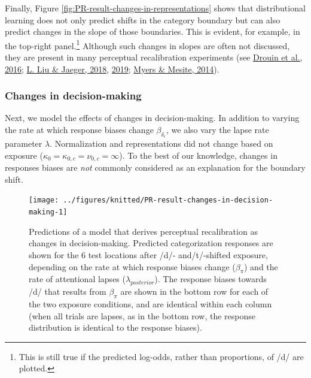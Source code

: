 \documentclass[
  11pt,
  english,
  man,floatsintext]{apa6}
\begin{document}
Finally, Figure \ref{fig:PR-result-changes-in-representations} shows that distributional learning does not only predict shifts in the category boundary but can also predict changes in the slope of those boundaries. This is evident, for example, in the top-right panel.\footnote{This is still true if the predicted log-odds, rather than proportions, of /d/ are plotted.} Although such changes in slopes are often not discussed, they are present in many perceptual recalibration experiments (see \protect\hyperlink{ref-drouin2016}{Drouin et al., 2016}; \protect\hyperlink{ref-liu-jaeger2018}{L. Liu \& Jaeger, 2018}, \protect\hyperlink{ref-liu-jaeger2019}{2019}; \protect\hyperlink{ref-myers-mesite2014}{Myers \& Mesite, 2014}).

\hypertarget{changes-in-decision-making}{%
\subsubsection{Changes in decision-making}\label{changes-in-decision-making}}

Next, we model the effects of changes in decision-making. In addition to varying the rate at which response biases change \(\beta_{\delta_\epsilon}\), we also vary the lapse rate parameter \(\lambda\). Normalization and representations did not change based on exposure (\(\kappa_0 = \kappa_{0,c} = \nu_{0,c} = \infty\)). To the best of our knowledge, changes in responses biases are \emph{not} commonly considered as an explanation for the boundary shift.



\begin{figure}

{\centering \texttt{[image: ../figures/knitted/PR-result-changes-in-decision-making-1]} 

}

\caption{Predictions of a model that derives perceptual recalibration as changes in decision-making. Predicted categorization responses are shown for the 6 test locations after /d/- and/t/-shifted exposure, depending on the rate at which response biases change (\(\beta_{\pi}\)) and the rate of attentional lapses (\(\lambda_{posterior}\)). The response biases towards /d/ that results from \(\beta_{\pi}\) are shown in the bottom row for each of the two exposure conditions, and are identical within each column (when all trials are lapses, as in the bottom row, the response distribution is identical to the response biases).}\label{fig:PR-result-changes-in-decision-making}
\end{figure}
\end{document}
